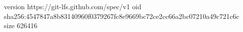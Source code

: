 version https://git-lfs.github.com/spec/v1
oid sha256:4547847a8b83140960f0379267fc8e9669bc72ce2cc66a2bc07210a49c721c6c
size 626416
